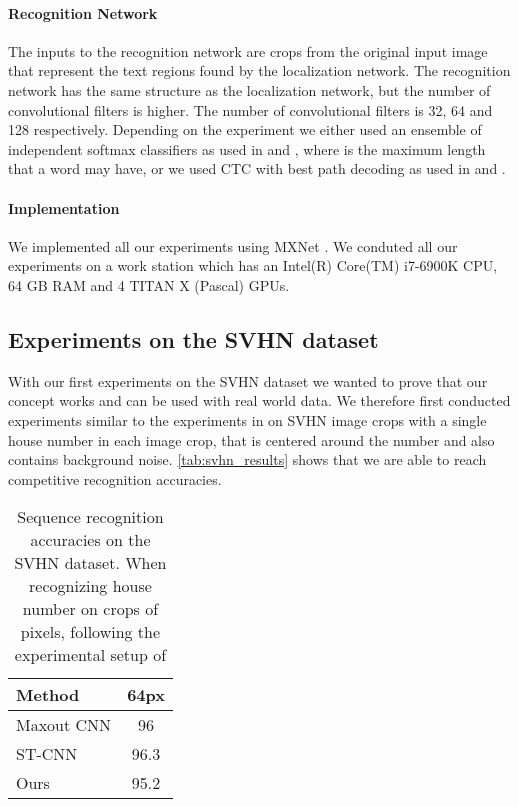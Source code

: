 \documentclass[10pt,twocolumn,letterpaper]{article}
\begin{document}
\paragraph{Recognition Network}
The inputs to the recognition network are  crops from the original input image that represent the text regions found by the localization network.
The recognition network has the same structure as the localization network, but the number of convolutional filters is higher.
The number of convolutional filters is 32, 64 and 128 respectively.
Depending on the experiment we either used an ensemble of  independent softmax classifiers as used in \cite{Goodfellow2014MultiDigit} and \cite{Jaderberg2014Deep}, where  is the maximum length that a word may have, or we used \ac{CTC} with best path decoding as used in \cite{He2016Reading} and \cite{Shi2016EndToEnd}.

\paragraph{Implementation}
We implemented all our experiments using MXNet \cite{Chen2015Mxnet}. We conduted all our experiments on a work station which has an Intel(R) Core(TM) i7-6900K CPU, 64 GB RAM and 4 TITAN X (Pascal) GPUs.

\subsection{Experiments on the SVHN dataset}
\label{ssec:svhn_experiments}

With our first experiments on the SVHN dataset \cite{Netzer2011Reading} we wanted to prove that our concept works and can be used with real world data.
We therefore first conducted experiments similar to the experiments in \cite{Jaderberg2015Spatial} on SVHN image crops with a single house number in each image crop, that is centered around the number and also contains background noise.
\autoref{tab:svhn_results} shows that we are able to reach competitive recognition accuracies.

\begin{table}
	\begin{center}
		\begin{tabular}{|l|c|}
			\hline
			Method & 64px \\
			\hline
			Maxout CNN \cite{Goodfellow2014MultiDigit} & 96 \\
			ST-CNN \cite{Jaderberg2015Spatial} & 96.3 \\
			\hline
			Ours & 95.2 \\
			\hline
		\end{tabular}
	\end{center}
	\caption{Sequence recognition accuracies on the SVHN dataset. When recognizing house number on crops of  pixels, following the experimental setup of \cite{Goodfellow2014MultiDigit}}
	\label{tab:svhn_results}
\end{table}
\end{document}
